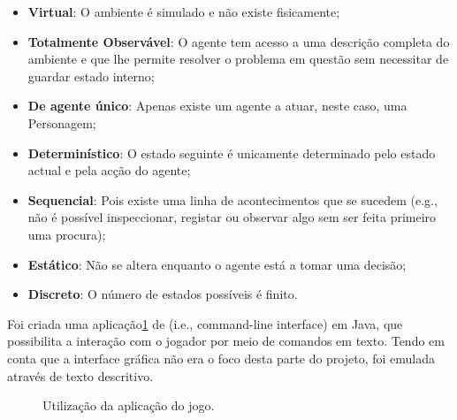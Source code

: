 \begin{itemize}
    \item \textbf{Virtual}: O ambiente é simulado e não existe fisicamente;
    \item \textbf{Totalmente Observável}: O agente tem acesso a uma descrição completa do ambiente e que lhe permite resolver o problema em questão sem necessitar de guardar estado interno;
    \item \textbf{De agente único}: Apenas existe um agente a atuar, neste caso, uma Personagem;
    \item \textbf{Determinístico}: O estado seguinte é unicamente determinado pelo estado actual e pela acção do agente;
    \item \textbf{Sequencial}: Pois existe uma linha de acontecimentos que se sucedem (e.g., não é possível inspeccionar, registar ou observar algo sem ser feita primeiro uma procura);
    \item \textbf{Estático}: Não se altera enquanto o agente está a tomar uma decisão;
    \item \textbf{Discreto}: O número de estados possíveis é finito.
\end{itemize}

Foi criada uma aplicação\ref{fig:projeto-parte1-jogo} de  (i.e., command-line interface) em Java, que possibilita a interação com o jogador por meio de comandos em texto.
Tendo em conta que a interface gráfica não era o foco desta parte do projeto, foi emulada através de texto descritivo.

\begin{figure}[H]
    \begin{center}
    \end{center}
    \caption{Utilização da aplicação do jogo.}\label{fig:projeto-parte1-jogo}
\end{figure}

